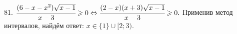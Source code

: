 81. $\cfrac{(6-x-x^2)\sqrt{x-1}}{x-3}\geqslant0\Leftrightarrow\cfrac{(2-x)(x+3)\sqrt{x-1}}{x-3}\geqslant0.$ Применив метод интервалов, найдём ответ: $x\in\{1\}\cup[2;3).$
\begin{figure}[ht!]
\end{figure}\newpage\noindent
